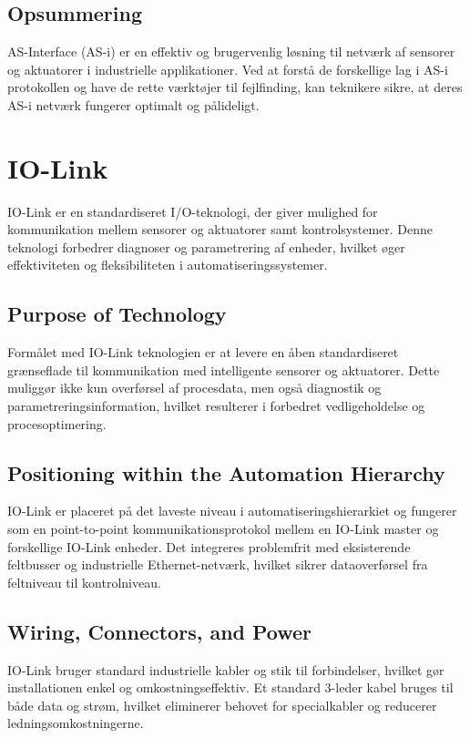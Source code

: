 \subsection{Opsummering}
AS-Interface (AS-i) er en effektiv og brugervenlig løsning til netværk af sensorer og aktuatorer i industrielle applikationer. Ved at forstå de forskellige lag i AS-i protokollen og have de rette værktøjer til fejlfinding, kan teknikere sikre, at deres AS-i netværk fungerer optimalt og pålideligt.

\section{IO-Link}
IO-Link er en standardiseret I/O-teknologi, der giver mulighed for kommunikation mellem sensorer og aktuatorer samt kontrolsystemer. Denne teknologi forbedrer diagnoser og parametrering af enheder, hvilket øger effektiviteten og fleksibiliteten i automatiseringssystemer.

\subsection{Purpose of Technology}
Formålet med IO-Link teknologien er at levere en åben standardiseret grænseflade til kommunikation med intelligente sensorer og aktuatorer. Dette muliggør ikke kun overførsel af procesdata, men også diagnostik og parametreringsinformation, hvilket resulterer i forbedret vedligeholdelse og procesoptimering.

\subsection{Positioning within the Automation Hierarchy}
IO-Link er placeret på det laveste niveau i automatiseringshierarkiet og fungerer som en point-to-point kommunikationsprotokol mellem en IO-Link master og forskellige IO-Link enheder. Det integreres problemfrit med eksisterende feltbusser og industrielle Ethernet-netværk, hvilket sikrer dataoverførsel fra feltniveau til kontrolniveau.

\subsection{Wiring, Connectors, and Power}
IO-Link bruger standard industrielle kabler og stik til forbindelser, hvilket gør installationen enkel og omkostningseffektiv. Et standard 3-leder kabel bruges til både data og strøm, hvilket eliminerer behovet for specialkabler og reducerer ledningsomkostningerne.

